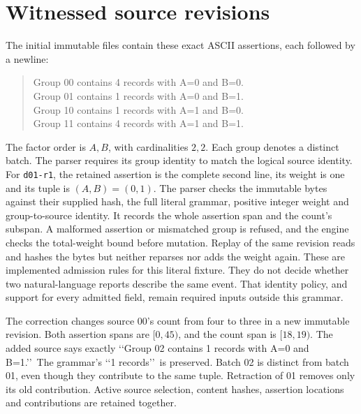 \section{Witnessed source revisions}
\label{app:dm-updates}
The initial immutable files contain these exact ASCII assertions, each followed by a newline:
\begin{quote}\small
Group 00 contains 4 records with A=0 and B=0.\\
Group 01 contains 1 records with A=0 and B=1.\\
Group 10 contains 1 records with A=1 and B=0.\\
Group 11 contains 4 records with A=1 and B=1.
\end{quote}
The factor order is \(A,B\), with cardinalities \(2,2\).
Each group denotes a distinct batch.
The parser requires its group identity to match the logical source identity.
For \texttt{d01-r1}, the retained assertion is the complete second line, its weight is one and its tuple is \((A,B)=(0,1)\).
The parser checks the immutable bytes against their supplied hash, the full literal grammar, positive integer weight and group-to-source identity.
It records the whole assertion span and the count's subspan.
A malformed assertion or mismatched group is refused, and the engine checks the total-weight bound before mutation.
Replay of the same revision reads and hashes the bytes but neither reparses nor adds the weight again.
These are implemented admission rules for this literal fixture.
They do not decide whether two natural-language reports describe the same event.
That identity policy, and support for every admitted field, remain required inputs outside this grammar.

The correction changes source 00's count from four to three in a new immutable revision.
Both assertion spans are \([0,45)\), and the count span is \([18,19)\).
The added source says exactly
\lq\lq Group 02 contains 1 records with A=0 and B=1.\rq\rq\
The grammar's \lq\lq 1 records\rq\rq\ is preserved.
Batch 02 is distinct from batch 01, even though they contribute to the same tuple.
Retraction of 01 removes only its old contribution.
Active source selection, content hashes, assertion locations and contributions are retained together.

